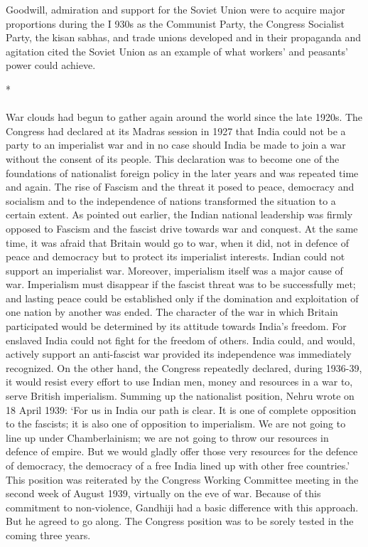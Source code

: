 Goodwill, admiration and support for the Soviet Union were to acquire major proportions during the I 930s as the Communist Party, the Congress Socialist Party, the kisan sabhas, and trade unions developed and in their propaganda and agitation cited the Soviet Union as an example of what workers' and peasants' power could achieve.

\begin{center}*\end{center}

\paragraph*{}


War clouds had begun to gather again around the world since the late 1920s. The Congress had declared at its Madras session in 1927 that India could not be a party to an imperialist war and in no case should India be made to join a war without the consent of its people. This declaration was to become one of the foundations of nationalist foreign policy in the later years and was repeated time and again. The rise of Fascism and the threat it posed to peace, democracy and socialism and to the independence of nations transformed the situation to a certain extent. As pointed out earlier, the Indian national leadership was firmly opposed to Fascism and the fascist drive towards war and conquest. At the same time, it was afraid that Britain would go to war, when it did, not in defence of peace and democracy but to protect its imperialist interests. Indian could not support an imperialist war. Moreover, imperialism itself was a major cause of war. Imperialism must disappear if the fascist threat was to be successfully met; and lasting peace could be established only if the domination and exploitation of one nation by another was ended. The character of the war in which Britain participated would be determined by its attitude towards India's freedom. For enslaved India could not fight for the freedom of others. India could, and would, actively support an anti-fascist war provided its independence was immediately recognized. On the other hand, the Congress repeatedly declared, during 1936-39, it would resist every effort to use Indian men, money and resources in a war to, serve British imperialism. Summing up the nationalist position, Nehru wrote on 18 April 1939: `For us in India our path is clear. It is one of complete opposition to the fascists; it is also one of opposition to imperialism. We are not going to line up under Chamberlainism; we are not going to throw our resources in defence of empire. But we would gladly offer those very resources for the defence of democracy, the democracy of a free India lined up with other free countries.' This position was reiterated by the Congress Working Committee meeting in the second week of August 1939, virtually on the eve of war. Because of this commitment to non-violence, Gandhiji had a basic difference with this approach. But he agreed to go along. The Congress position was to be sorely tested in the coming three years.
